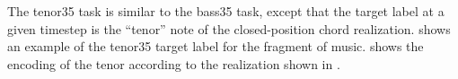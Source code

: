 
The \gls{tenor35} task is similar to the \gls{bass35} task,
except that the target label at a given timestep is the
``tenor'' note of the \gls{closed-position} chord
realization.  shows an example of the
\gls{tenor35} target label for the fragment of music.
 shows the encoding of the tenor
according to the realization shown in .


